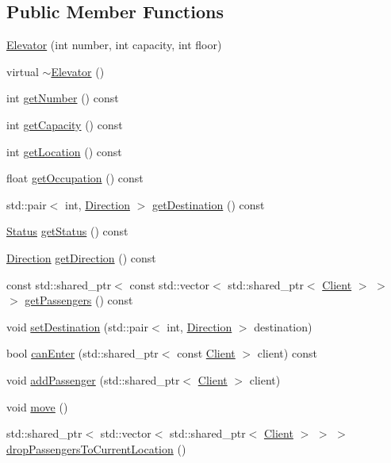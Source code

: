 \subsection*{Public Member Functions}
\begin{DoxyCompactItemize}
\item 
\hyperlink{class_elevator_a43c3de38489fb58f17fc60e91bd522e7}{Elevator} (int number, int capacity, int floor)
\item 
virtual \hyperlink{class_elevator_a6e2fb71cfcde094c087b8a19a8bcab4b}{$\sim$\+Elevator} ()
\item 
int \hyperlink{class_elevator_a8e21ac6a7a3923ab2fd41b6d4b8295ba}{get\+Number} () const 
\item 
int \hyperlink{class_elevator_ab1a532d6b4df19b77e7a8ce4727e6d74}{get\+Capacity} () const 
\item 
int \hyperlink{class_elevator_a6b50953b97442601165a3fe656d76776}{get\+Location} () const 
\item 
float \hyperlink{class_elevator_a2189014eaa1af1a32eb6d12c13b820ff}{get\+Occupation} () const 
\item 
std\+::pair$<$ int, \hyperlink{_direction_8h_a224b9163917ac32fc95a60d8c1eec3aa}{Direction} $>$ \hyperlink{class_elevator_ad8cb66c8d7bdd3e82faf25e702bbc024}{get\+Destination} () const 
\item 
\hyperlink{_status_8h_a67a0db04d321a74b7e7fcfd3f1a3f70b}{Status} \hyperlink{class_elevator_a53345cce9f31247b8b85cba2cac91922}{get\+Status} () const 
\item 
\hyperlink{_direction_8h_a224b9163917ac32fc95a60d8c1eec3aa}{Direction} \hyperlink{class_elevator_a658315b18e536447f56a68220e35f45b}{get\+Direction} () const 
\item 
const std\+::shared\+\_\+ptr$<$ const std\+::vector$<$ std\+::shared\+\_\+ptr$<$ \hyperlink{class_client}{Client} $>$ $>$ $>$ \hyperlink{class_elevator_ad12bd410a7c6068b3653d4756cdad7c3}{get\+Passengers} () const 
\item 
void \hyperlink{class_elevator_ae5dbc53a35f77c0a8715b3e0f4b7d304}{set\+Destination} (std\+::pair$<$ int, \hyperlink{_direction_8h_a224b9163917ac32fc95a60d8c1eec3aa}{Direction} $>$ destination)
\item 
bool \hyperlink{class_elevator_aca22adae98cf171ac842c721dbb25248}{can\+Enter} (std\+::shared\+\_\+ptr$<$ const \hyperlink{class_client}{Client} $>$ client) const 
\item 
void \hyperlink{class_elevator_a79725eb058974b68669b717d956ddadd}{add\+Passenger} (std\+::shared\+\_\+ptr$<$ \hyperlink{class_client}{Client} $>$ client)
\item 
void \hyperlink{class_elevator_aebc0dff2d1966a4ea336a159b95bdf05}{move} ()
\item 
std\+::shared\+\_\+ptr$<$ std\+::vector$<$ std\+::shared\+\_\+ptr$<$ \hyperlink{class_client}{Client} $>$ $>$ $>$ \hyperlink{class_elevator_aa729c45a7dc7828f9bf4e30bbeb7ed83}{drop\+Passengers\+To\+Current\+Location} ()
\end{DoxyCompactItemize}
